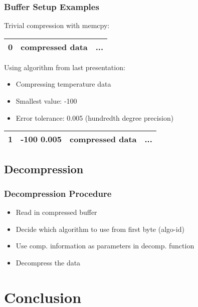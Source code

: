 \documentclass[compress]{beamer}
\begin{document}
\begin{frame}
	\frametitle{Buffer Setup Examples}

	Trivial compression with memcpy:\\
	\begin{center}
	\begin{tabular}{|c||cc|}
		\hline
		0 & compressed data & ... \\
		\hline
	\end{tabular}
	\end{center}

	\bigskip
	\pause

	Using algorithm from last presentation:\\
	\begin{itemize}
		\item Compressing temperature data
		\item Smallest value: -100
		\item Error tolerance: 0.005 (hundredth degree precision)
	\end{itemize}
	\begin{center}
	\begin{tabular}{|c|c|cc|}
		\hline
		1 & -100 0.005 & compressed data & ... \\
		\hline
	\end{tabular}
	\end{center}

\end{frame}

\subsection{Decompression}

\begin{frame}
	\frametitle{Decompression Procedure}

	\begin{itemize}
		\item Read in compressed buffer
		\item Decide which algorithm to use from first byte (algo-id)
		\item Use comp. information as parameters in decomp. function
		\item Decompress the data

	\end{itemize}
\end{frame}

\section{Conclusion}
\end{document}

